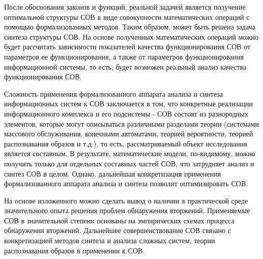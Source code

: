 После обоснования законов и функций, реальной задачей является получение оптимальной
структуры СОВ в виде совокупности математических операций с помощью формализованных
методов. Таким образом, может быть решена задача синтеза структуры СОВ. На основе
полученных математических операций можно будет рассчитать зависимости показателей
качества функционирования СОВ от параметров ее функционирования, а также от параметров
функционирования информационной системы, то есть, будет возможен реальный анализ качества
функционирования СОВ.

Сложность применения формализованного аппарата анализа и синтеза информационных систем
к СОВ заключается в том, что конкретные реализации информационного комплекса и его
подсистемы - СОВ состоят из разнородных элементов, которые могут описываться различными
разделами теории (системами массового обслуживания, конечными автоматами, теорией
вероятности, теорией распознавания образов и т.д.), то есть, рассматриваемый объект
исследования является составным. В результате, математические модели, по-видимому,
можно получить только для отдельных составных частей СОВ, что затрудняет анализ и
синтез СОВ в целом. Однако, дальнейшая конкретизация применения формализованного
аппарата анализа и синтеза позволит оптимизировать СОВ.

На основе изложенного можно сделать вывод о наличии в практической среде значительного опыта
решения проблем обнаружения вторжений. Применяемые СОВ в значительной степени основаны на
эмпирических схемах процесса обнаружения вторжений. Дальнейшее совершенствование СОВ связано
с конкретизацией методов синтеза и анализа сложных систем, теории распознавания образов в
применении к СОВ.

